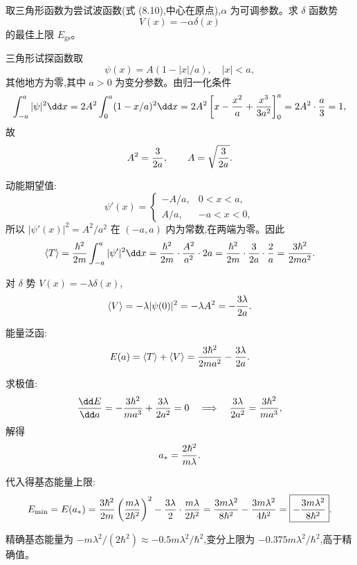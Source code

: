 \begin{question}
取三角形函数为尝试波函数(式 (8.10),中心在原点),$\alpha$ 为可调参数。求 $\delta$ 函数势
\[
V(x)=-\alpha\delta(x)
\]
的最佳上限 $E_{\mathrm{gs}}$。

\par\smallskip
{}

\begin{solution}
三角形试探函数取
\[
\psi(x)=A(1-|x|/a),\quad |x|<a,
\]
其他地方为零,其中 $a>0$ 为变分参数。由归一化条件
\[
\int_{-a}^a|\psi|^2\dd x=2A^2\int_0^a(1-x/a)^2\dd x
=2A^2\left[x-{x^2\over a}+{x^3\over3a^2}\right]_0^a
=2A^2\cdot{a\over3}=1,
\]
故
\[
A^2={3\over2a},\qquad A=\sqrt{3\over2a}.
\]

动能期望值:
\[
\psi'(x)=\begin{cases}
-A/a, & 0<x<a,\\
A/a, & -a<x<0,
\end{cases}
\]
所以 $|\psi'(x)|^2=A^2/a^2$ 在 $(-a,a)$ 内为常数,在两端为零。因此
\[
\langle T\rangle={\hbar^2\over2m}\int_{-a}^a|\psi'|^2\dd x
={\hbar^2\over2m}\cdot{A^2\over a^2}\cdot 2a
={\hbar^2\over2m}\cdot{3\over2a}\cdot{2\over a}
={3\hbar^2\over2ma^2}.
\]

对 $\delta$ 势 $V(x)=-\lambda\delta(x)$,
\[
\langle V\rangle=-\lambda|\psi(0)|^2=-\lambda A^2=-{3\lambda\over2a}.
\]

能量泛函:
\[
E(a)=\langle T\rangle+\langle V\rangle
={3\hbar^2\over2ma^2}-{3\lambda\over2a}.
\]

求极值:
\[
{\dd E\over\dd a}=-{3\hbar^2\over ma^3}+{3\lambda\over2a^2}=0
\quad\Longrightarrow\quad
{3\lambda\over2a^2}={3\hbar^2\over ma^3},
\]
解得
\[
a_*={2\hbar^2\over m\lambda}.
\]

代入得基态能量上限:
\[
E_{\min}=E(a_*)={3\hbar^2\over2m}\left({m\lambda\over2\hbar^2}\right)^2
-{3\lambda\over2}\cdot{m\lambda\over2\hbar^2}
={3m\lambda^2\over8\hbar^2}-{3m\lambda^2\over4\hbar^2}
=\boxed{-{3m\lambda^2\over8\hbar^2}}.
\]

精确基态能量为 $-m\lambda^2/(2\hbar^2)\approx-0.5m\lambda^2/\hbar^2$,变分上限为 $-0.375m\lambda^2/\hbar^2$,高于精确值。
\end{solution}
\end{question}

